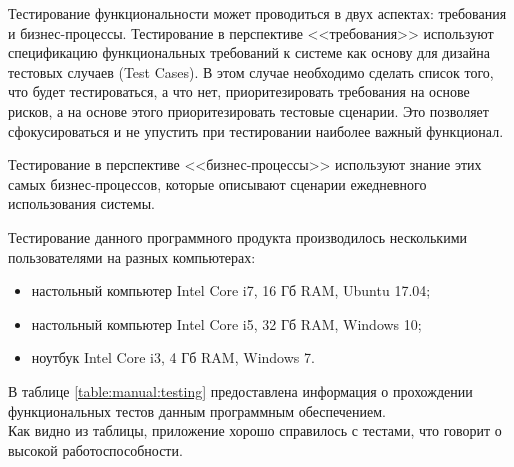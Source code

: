 Тестирование функциональности может проводиться в двух аспектах: требования и бизнес-процессы. Тестирование в перспективе <<требования>>  используют спецификацию функциональных требований к системе как основу для дизайна тестовых случаев (Test Cases). В этом случае необходимо сделать список того, что будет тестироваться, а что нет, приоритезировать требования на основе рисков, а на основе этого приоритезировать тестовые сценарии. Это позволяет сфокусироваться и не упустить при тестировании наиболее важный функционал. 

Тестирование в перспективе <<бизнес-процессы>> используют знание этих самых бизнес-процессов, которые описывают сценарии ежедневного использования системы.

Тестирование данного программного продукта производилось несколькими пользователями на разных компьютерах: 
\begin{itemize}
\item настольный компьютер Intel Core i7, 16 Гб RAM, Ubuntu 17.04; 
\item настольный компьютер Intel Core i5, 32 Гб RAM, Windows 10;
\item ноутбук Intel Core i3, 4 Гб RAM, Windows 7.
\end{itemize}

 В таблице \ref{table:manual:testing} предоставлена информация о прохождении функциональных тестов данным программным обеспечением.\\

Как видно из таблицы, приложение хорошо справилось с тестами, что говорит о высокой работоспособности.





